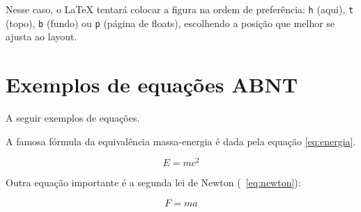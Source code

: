 Nesse caso, o LaTeX tentará colocar a figura na ordem de preferência: \texttt{h} (aqui), \texttt{t} (topo), \texttt{b} (fundo) ou \texttt{p} (página de floats), escolhendo a posição que melhor se ajusta ao layout.

\section{Exemplos de equações ABNT}

A seguir exemplos de equações.

A famosa fórmula da equivalência massa-energia é dada pela
equação \eqref{eq:energia}.

\begin{equation}
    E = mc^2
\label{eq:energia}
\end{equation}

Outra equação importante é a segunda lei de Newton (~\ref{eq:newton}):

\begin{equation}
    F = ma
\label{eq:newton}
\end{equation}
